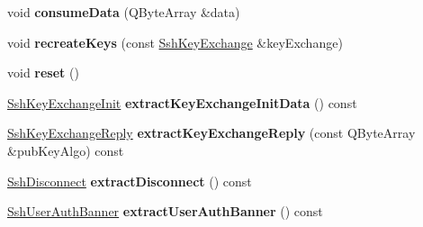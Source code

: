 \begin{DoxyCompactItemize}
\item 
\mbox{\label{class_q_ssh_1_1_internal_1_1_ssh_incoming_packet_ac3da27eddcee94de92d873dc81176256}} 
void {\bfseries consume\+Data} (Q\+Byte\+Array \&data)
\item 
\mbox{\label{class_q_ssh_1_1_internal_1_1_ssh_incoming_packet_ac695da028882db2c5bfda1ceaff55878}} 
void {\bfseries recreate\+Keys} (const \mbox{\hyperlink{class_q_ssh_1_1_internal_1_1_ssh_key_exchange}{Ssh\+Key\+Exchange}} \&key\+Exchange)
\item 
\mbox{\label{class_q_ssh_1_1_internal_1_1_ssh_incoming_packet_ad1f78b904ca4547d24457cfca22de22c}} 
void {\bfseries reset} ()
\item 
\mbox{\label{class_q_ssh_1_1_internal_1_1_ssh_incoming_packet_a95eadf2d01bea61fecdf21cd006a70a6}} 
\mbox{\hyperlink{struct_q_ssh_1_1_internal_1_1_ssh_key_exchange_init}{Ssh\+Key\+Exchange\+Init}} {\bfseries extract\+Key\+Exchange\+Init\+Data} () const
\item 
\mbox{\label{class_q_ssh_1_1_internal_1_1_ssh_incoming_packet_ab47dd8f5120868dae3c1ca13ec4d8619}} 
\mbox{\hyperlink{struct_q_ssh_1_1_internal_1_1_ssh_key_exchange_reply}{Ssh\+Key\+Exchange\+Reply}} {\bfseries extract\+Key\+Exchange\+Reply} (const Q\+Byte\+Array \&pub\+Key\+Algo) const
\item 
\mbox{\label{class_q_ssh_1_1_internal_1_1_ssh_incoming_packet_a36b7ef7011e8c21f3f15b90baa0a405e}} 
\mbox{\hyperlink{struct_q_ssh_1_1_internal_1_1_ssh_disconnect}{Ssh\+Disconnect}} {\bfseries extract\+Disconnect} () const
\item 
\mbox{\label{class_q_ssh_1_1_internal_1_1_ssh_incoming_packet_a7cdf57bb2f2e2b19a9724ca201db7135}} 
\mbox{\hyperlink{struct_q_ssh_1_1_internal_1_1_ssh_user_auth_banner}{Ssh\+User\+Auth\+Banner}} {\bfseries extract\+User\+Auth\+Banner} () const
\item 

\end{DoxyCompactItemize}
